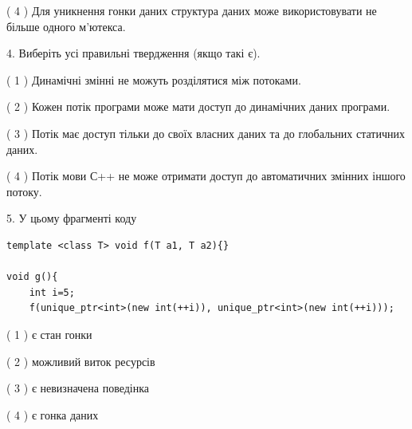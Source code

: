 \documentclass[12pt, ukrainian]{article}
\begin{document}
\begin {large}
{( 4 ) Для уникнення гонки даних структура даних може використовувати не більше одного м’ютекса.%


4. Виберіть усі правильні твердження (якщо такі є).\par
\vspace{2mm}

( 1 ) Динамічні змінні не можуть розділятися між потоками.%

( 2 ) Кожен потік програми може мати доступ до динамічних даних програми.%

( 3 ) Потік має доступ тільки до своїх власних даних та до глобальних статичних даних.%

( 4 ) Потік мови С++ не може отримати доступ до автоматичних змінних іншого потоку.%


5. У цьому фрагменті коду
\begin{verbatim}
template <class T> void f(T a1, T a2){}

void g(){
    int i=5;
    f(unique_ptr<int>(new int(++i)), unique_ptr<int>(new int(++i)));
\end{verbatim}

( 1 ) є стан гонки%

( 2 ) можливий виток ресурсів%

( 3 ) є невизначена поведінка%

( 4 ) є гонка даних%
}
\end {large}
\end{document}

